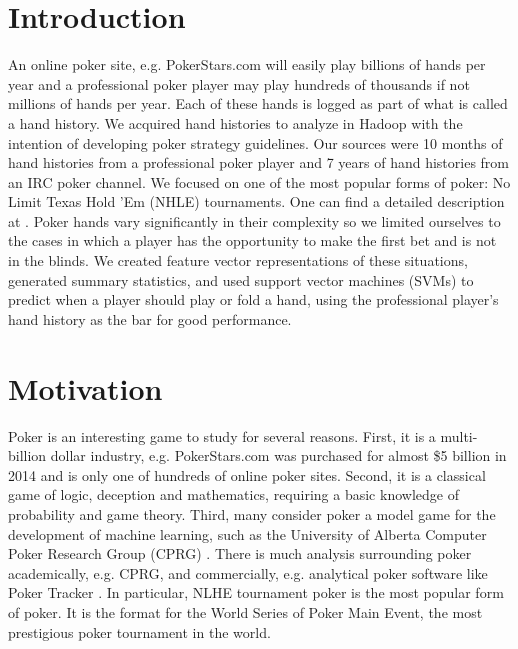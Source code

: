 \documentclass[twoside]{article}
\begin{document}
\begin{multicols}{2} %

\section{Introduction}
An online poker site, e.g. PokerStars.com will easily play billions of hands per year and a professional poker player may play hundreds of thousands if not millions of hands per year. Each of these hands is logged as part of what is called a hand history.
We acquired hand histories to analyze in Hadoop with the intention of developing poker strategy guidelines. Our sources were 10 months of hand histories from a professional poker player and 7 years of hand histories from an IRC poker channel.
We focused on one of the most popular forms of poker: No Limit Texas Hold 'Em (NHLE) tournaments. One can find a detailed description at \cite{TexasHoldem}. Poker hands vary significantly in their complexity so we limited ourselves to the cases in which a player has the opportunity to make the first bet and is not in the blinds. We created feature vector representations of these situations, generated summary statistics, and used support vector machines (SVMs) to predict when a player should play or fold a hand, using the professional player's hand history as the bar for good performance.


\section{Motivation}

Poker is an interesting game to study for several reasons. First, it is a multi-billion dollar industry, e.g. PokerStars.com was purchased for almost \$5 billion in 2014 \cite{PokerStarsAcquired} and is only one of hundreds of online poker sites. Second, it is a classical game of logic, deception and mathematics, requiring a basic knowledge of probability and game theory. Third, many consider poker a model game for the development of machine learning, such as the University of Alberta Computer Poker Research Group (CPRG) \cite{SVMPoker}. There is much analysis surrounding poker academically, e.g. CPRG, and commercially, e.g. analytical poker software like Poker Tracker \cite{PokerTracker}. In particular, NLHE tournament poker is the most popular form of poker. It is the format for the World Series of Poker Main Event, the most prestigious poker tournament in the world. 


\end{multicols}
\end{document}
